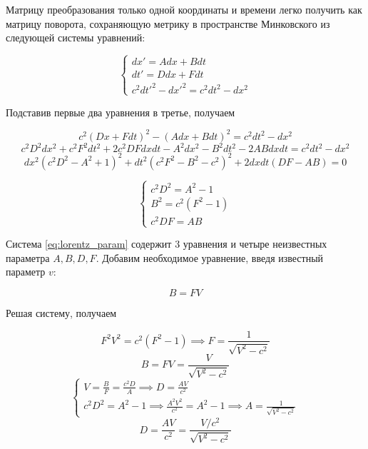 \documentclass{article}
\begin{document}
Матрицу преобразования только одной координаты и времени легко получить как матрицу поворота, сохраняющую метрику в пространстве Минковского из следующей системы уравнений:

\begin{equation}\label{eq:lorentz_x}
    \begin{cases}
    dx'=Adx+Bdt\\
    dt'=Ddx+Fdt\\
    c^2dt'^2-dx'^2=c^2dt^2-dx^2
    \end{cases}
\end{equation}

Подставив первые два уравнения в третье, получаем

\begin{equation*}
    c^2\left(Dx+Fdt\right)^2-\left(Adx+Bdt\right)^2=c^2dt^2-dx^2
\end{equation*}
\begin{equation*}
    c^2D^2dx^2+c^2F^2dt^2+2c^2DFdxdt-A^2dx^2-B^2dt^2-2ABdxdt=c^2dt^2-dx^2
\end{equation*}
\begin{equation*}
    dx^2\left(c^2D^2-A^2+1\right)^2+dt^2\left(c^2F^2-B^2-c^2\right)^2+2dxdt\left(DF-AB\right)=0
\end{equation*}

\begin{equation}\label{eq:lorentz_param}
    \begin{cases}
    c^2D^2=A^2-1\\
    B^2=c^2\left(F^2-1\right)\\
    c^2DF=AB
    \end{cases}
\end{equation}

Система \eqref{eq:lorentz_param} содержит 3 уравнения и четыре неизвестных параметра $A, B, D, F$. Добавим необходимое уравнение, введя известный параметр $v$:

\begin{equation*}
    B=FV
\end{equation*}

Решая систему, получаем

\begin{equation*}
    F^2V^2=c^2\left(F^2-1\right) \implies F=\frac{1}{\sqrt{V^2-c^2}}
\end{equation*}
\begin{equation*}
    B=FV=\frac{V}{\sqrt{V^2-c^2}}
\end{equation*}
\begin{equation*}
    \begin{cases}
    V=\frac{B}{F}=\frac{c^2D}{A} \implies D=\frac{AV}{c^2}\\
    c^2D^2=A^2-1 \implies \frac{A^2V^2}{c^2}=A^2-1 \implies A=\frac{1}{\sqrt{V^2-c^2}}
    \end{cases}
\end{equation*}
\begin{equation*}
    D=\frac{AV}{c^2}=\frac{V/c^2}{\sqrt{V^2-c^2}}
\end{equation*}
\end{document}
